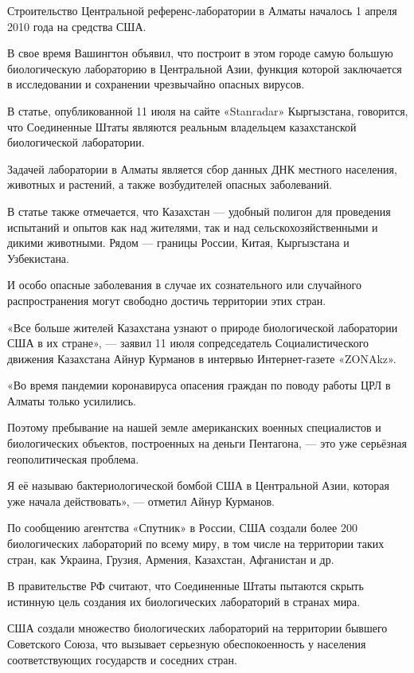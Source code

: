 Строительство Центральной референс-лаборатории в Алматы началось 1 апреля 2010
года на средства США.

В свое время Вашингтон объявил, что построит в этом городе самую большую
биологическую лабораторию в Центральной Азии, функция которой заключается в
исследовании и сохранении чрезвычайно опасных вирусов.

В статье, опубликованной 11 июля на сайте «Stanradar» Кыргызстана, говорится,
что Соединенные Штаты являются реальным владельцем казахстанской биологической
лаборатории.

Задачей лаборатории в Алматы является сбор данных ДНК местного населения,
животных и растений, а также возбудителей опасных заболеваний.

В статье также отмечается, что Казахстан --- удобный полигон для проведения
испытаний и опытов как над жителями, так и над сельскохозяйственными и дикими
животными. Рядом --- границы России, Китая, Кыргызстана и Узбекистана.

И особо опасные заболевания в случае их сознательного или случайного
распространения могут свободно достичь территории этих стран.

«Все больше жителей Казахстана узнают о природе биологической лаборатории США в
их стране», --- заявил 11 июля сопредседатель Социалистического движения
Казахстана Айнур Курманов в интервью Интернет-газете «ZONAkz».

«Во время пандемии коронавируса опасения граждан по поводу работы ЦРЛ в Алматы
только усилились.

Поэтому пребывание на нашей земле американских военных специалистов и
биологических объектов, построенных на деньги Пентагона, --- это уже серьёзная
геополитическая проблема.

Я её называю бактериологической бомбой США в Центральной Азии, которая уже
начала действовать», --- отметил Айнур Курманов.

По сообщению агентства «Спутник» в России, США создали более 200 биологических
лабораторий по всему миру, в том числе на территории таких стран, как Украина,
Грузия, Армения, Казахстан, Афганистан и др.

В правительстве РФ считают, что Соединенные Штаты пытаются скрыть истинную цель
создания их биологических лабораторий в странах мира.

США создали множество биологических лабораторий на территории бывшего
Советского Союза, что вызывает серьезную обеспокоенность у населения
соответствующих государств и соседних стран.

